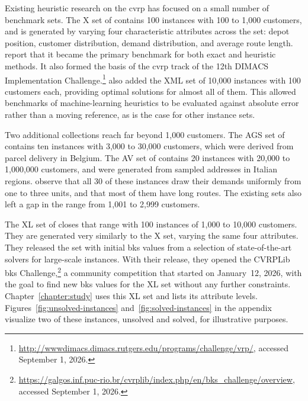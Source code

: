 Existing heuristic research on the \gls{cvrp} has focused on a small number of benchmark sets. The X set of \citet{uchoaNewBenchmarkInstances2017} contains 100 instances with 100 to 1{,}000 customers, and is generated by varying four characteristic attributes across the set: depot position, customer distribution, demand distribution, and average route length. \citet{queirogaXLInstancesCapacitated2026} report that it became the primary benchmark for both exact and heuristic methods. It also formed the basis of the \gls{cvrp} track of the 12th DIMACS Implementation Challenge.\footnote{\url{http://wwwdimacs.dimacs.rutgers.edu/programs/challenge/vrp/}, accessed September 1, 2026.} \citet{queiroga2022optimal} also added the XML set of 10{,}000 instances with 100 customers each, providing optimal solutions for almost all of them. This allowed benchmarks of machine-learning heuristics to be evaluated against absolute error rather than a moving reference, as is the case for other instance sets.

Two additional collections reach far beyond 1{,}000 customers. The AGS set of \citet{efficiently_arnold_2019} contains ten instances with 3{,}000 to 30{,}000 customers, which were derived from parcel delivery in Belgium. The AV set of \citet{accorsiRoutingOneMillion2024} contains 20 instances with 20{,}000 to 1{,}000{,}000 customers, and were generated from sampled addresses in Italian regions. \citet{queirogaXLInstancesCapacitated2026} observe that all 30 of these instances draw their demands uniformly from one to three units, and that most of them have long routes. The existing sets also left a gap in the range from 1{,}001 to 2{,}999 customers.

The XL set of \citet{queirogaXLInstancesCapacitated2026} closes that range with 100 instances of 1{,}000 to 10{,}000 customers. They are generated very similarly to the X set, varying the same four attributes. They released the set with initial \gls{bks} values from a selection of state-of-the-art solvers for large-scale instances. With their release, they opened the CVRPLib \gls{bks} Challenge,\footnote{\url{https://galgos.inf.puc-rio.br/cvrplib/index.php/en/bks_challenge/overview}, accessed September 1, 2026.} a community competition that started on January~12, 2026, with the goal to find new \gls{bks} values for the XL set without any further constraints. Chapter~\ref{chapter:study} uses this XL set and lists its attribute levels. Figures~\ref{fig:unsolved-instances} and~\ref{fig:solved-instances} in the appendix visualize two of these instances, unsolved and solved, for illustrative purposes.

